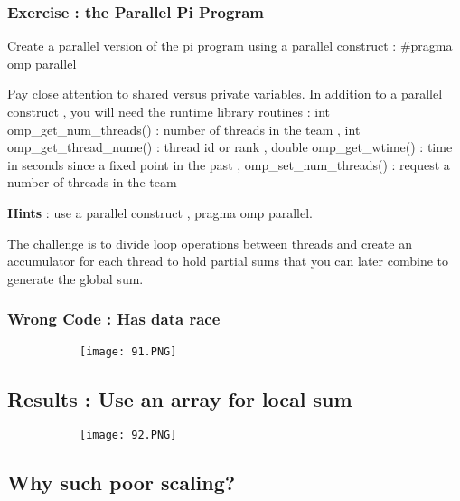 \documentclass{article}
\begin{document}
\subsubsection{Exercise : the Parallel Pi Program}

Create a parallel version of the pi program using a parallel construct : \#pragma omp parallel

Pay close attention to shared versus private variables. In addition to a parallel construct , you will need the runtime library routines : int omp\_get\_num\_threads() : number of threads in the team , int omp\_get\_thread\_nume() : thread id or rank , double omp\_get\_wtime() : time in seconds since a fixed point in the past , omp\_set\_num\_threads() : request a number of threads in the team

\textbf{Hints} : use a parallel construct , pragma omp parallel.

The challenge is to divide loop operations between threads and create an accumulator for each thread to hold partial sums that you can later combine to generate the global sum.

\vspace{40mm}

\subsubsection{Wrong Code : Has data race}

\begin{figure}[ht!]
  \centering
  \begin{subfigure}[b]{0.5\linewidth}
    \texttt{[image: 91.PNG]}
  \end{subfigure}
\end{figure}





\subsection{Results : Use an array for local sum}

\begin{figure}[ht!]
  \centering
  \begin{subfigure}[b]{0.5\linewidth}
    \texttt{[image: 92.PNG]}
  \end{subfigure}
\end{figure}

\subsection{Why such poor scaling?}
\end{document}
